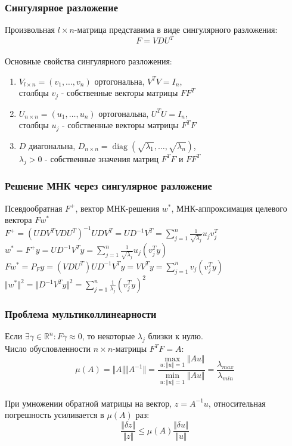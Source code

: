 \documentclass[12pt, aspectratio=169]{beamer}
\begin{document}
\begin{frame}\frametitle{Сингулярное разложение}
Произвольная $l \times n$-матрица представима в виде сингулярного разложения:\\
$$F = VDU^T$$\\
Основные свойства сингулярного разложения:\\
\begin{enumerate}[--]
\item $V_{l \times n} = (v_1, \dots, v_n)$ ортогональна, $V^TV = I_n$, \\столбцы $v_j$ - собственные векторы матрицы $FF^T$
\item $U_{n \times n} = (u_1, \dots, u_n)$ ортогональна, $U^TU = I_n$, \\столбцы $u_j$ - собственные векторы матрицы $F^TF$
\item $D$ диагональна, $D_{n \times n} = \operatorname{diag} (\sqrt{\lambda_1}, \dots, \sqrt{\lambda_n})$, \\$\lambda_j > 0$ - собственные значения матриц $F^TF$ и $FF^T$
\end{enumerate}
\end{frame}

\begin{frame}\frametitle{Решение МНК через сингулярное разложение}
Псевдообратная $F^+$, вектор МНК-решения $w^*$,
МНК-аппроксимация целевого вектора $Fw^*$\\
$F^+ = (UDV^TVDU^T)^{-1}UDV^T = UD^{-1}V^T = \sum\limits_{j=1}^n \frac{1}{\sqrt{\lambda_j}}  u_j v_j^T$\\
$ w^* = F^+y = UD^{-1}V^Ty = \sum\limits_{j=1}^n \frac{1}{\sqrt{\lambda_j}}  u_j (v_j^Ty)$\\
$F w^* = P_F y = (VDU^T)UD^{-1}V^Ty = VV^Ty = \sum\limits_{j=1}^n v_j (v_j^Ty)$\\
$\Vert w^* \Vert^2  = \Vert D^{-1}V^Ty \Vert^2 = \sum\limits_{j=1}^n \frac{1}{\lambda_j} (v_j^Ty)^2$
\end{frame}

\begin{frame}\frametitle{Проблема мультиколлинеарности}
Если $\exists \gamma \in \mathbb{R}^n: F\gamma \approx 0$, то некоторые $\lambda_j$ близки к нулю.\\
Число обусловленности $n \times n$-матрицы $F^TF = A$:
$$\mu(A) = \Vert A \Vert \Vert A^{-1} \Vert = \frac{\max\limits_{u: \Vert u \Vert = 1} \Vert A u \Vert}{\min\limits_{u: \Vert u \Vert = 1} \Vert A u \Vert} = \frac{\lambda_{max}}{\lambda_{min}}$$\\
При умножении обратной матрицы на вектор, $z = A^{-1}u$, относительная погрешность усиливается в $\mu(A)$ раз:\\
$$\frac{\Vert \delta z \Vert}{\Vert z \Vert } \leq \mu(A) \frac{\Vert \delta u \Vert}{\Vert u \Vert }$$
\end{frame}
\end{document}
